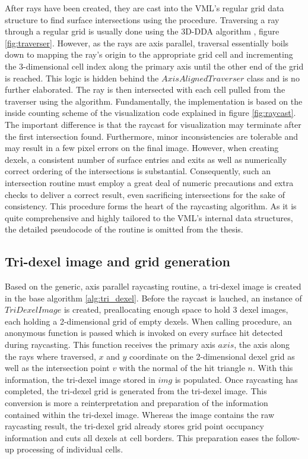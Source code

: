 After rays have been created, they are cast into the VML's regular grid data structure to find surface intersections using the  procedure.
Traversing a ray through a regular grid is usually done using the 3D-DDA algorithm \cite{3DDDA}, \cf figure \ref{fig:traverser}.
However, as the rays are axis parallel, traversal essentially boils down to mapping the ray's origin to the appropriate grid cell and incrementing the 3-dimensional cell index along the primary axis until the other end of the grid is reached.
This logic is hidden behind the $AxisAlignedTraverser$ class and is no further elaborated.
%
The ray is then intersected with each cell pulled from the traverser using the  algorithm.
Fundamentally, the implementation is based on the inside counting scheme of the visualization code explained in figure \ref{fig:raycast}.
The important difference is that the raycast for visualization may terminate after the first intersection found.
Furthermore, minor inconsistencies are tolerable and may result in a few pixel errors on the final image.
However, when creating dexels, a consistent number of surface entries and exits as well as numerically correct ordering of the intersections is substantial.
Consequently, such an intersection routine must employ a great deal of numeric precautions and extra checks to deliver a correct result, even sacrificing intersections for the sake of consistency.
This procedure forms the heart of the raycasting algorithm.
As it is quite comprehensive and highly tailored to the VML's internal data structures, the detailed pseudocode of the  routine is omitted from the thesis.


\subsection{Tri-dexel image and grid generation}
\label{sec:tri_dexel_dexel_image_generation}

Based on the generic, axis parallel raycasting routine, a tri-dexel image is created in the base algorithm \ref{alg:tri_dexel}.
Before the raycast is lauched, an instance of $TriDexelImage$ is created, preallocating enough space to hold 3 dexel images, each holding a 2-dimensional grid of empty dexels.
When calling  procedure, an anonymous function is passed which is invoked on every surface hit detected during raycasting.
This function receives the primary axis $axis$, \ie the axis along the rays where traversed, $x$ and $y$ coordinate on the 2-dimensional dexel grid as well as the intersection point $v$ with the normal of the hit triangle $n$.
With this information, the tri-dexel image stored in $img$ is populated.
Once raycasting has completed, the tri-dexel grid is generated from the tri-dexel image.
This conversion is more a reinterpretation and preparation of the information contained within the tri-dexel image.
Whereas the image contains the raw raycasting result, the tri-dexel grid already stores grid point occupancy information and cuts all dexels at cell borders.
This preparation eases the follow-up processing of individual cells.

